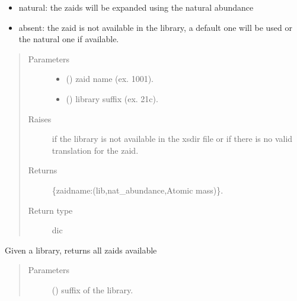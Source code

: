\documentclass[letterpaper,10pt,english]{sphinxmanual}
\begin{document}
\begin{fulllineitems}
\begin{fulllineitems}
\begin{description}
\begin{itemize}
\item {} 
\sphinxAtStartPar
natural: the zaids will be expanded using the natural abundance

\item {} 
\sphinxAtStartPar
absent: the zaid is not available in the library, a default one
will be used or the natural one if available.

\end{itemize}

\end{description}
\begin{quote}\begin{description}
\item[{Parameters}] \leavevmode\begin{itemize}
\item {} 
\sphinxAtStartPar
{} () \textendash{} zaid name (ex. 1001).

\item {} 
\sphinxAtStartPar
{} () \textendash{} library suffix (ex. 21c).

\end{itemize}

\item[{Raises}] \leavevmode
\sphinxAtStartPar
{} \textendash{} if the library is not available in the xsdir file or if there is
    no valid translation for the zaid.

\item[{Returns}] \leavevmode
\sphinxAtStartPar
{} \textendash{} \{zaidname:(lib,nat\_abundance,Atomic mass)\}.

\item[{Return type}] \leavevmode
\sphinxAtStartPar
dic

\end{description}\end{quote}

\end{fulllineitems}


\begin{fulllineitems}
\label{\detokenize{api/initobjects:libmanager.LibManager.get_libzaids}}
\sphinxAtStartPar
Given a library, returns all zaids available
\begin{quote}\begin{description}
\item[{Parameters}] \leavevmode
\sphinxAtStartPar
{} () \textendash{} suffix of the library.


\end{description}
\end{quote}
\end{fulllineitems}
\end{fulllineitems}
\end{document}
